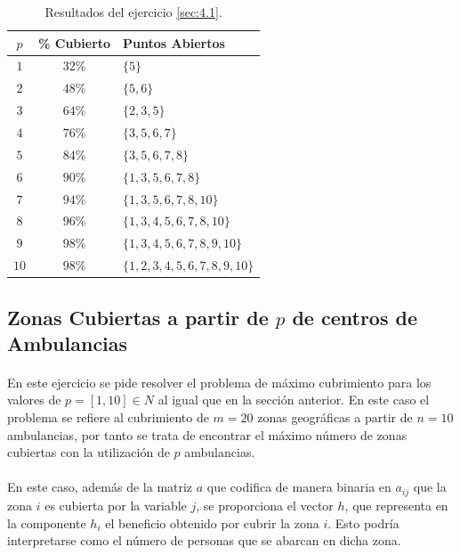 \documentclass[spanish]{article}
\begin{document}
			\begin{table}[h]
				\begin{center}
					\begin{tabular}{|c || c || l |}
						\hline
						$p$		&	\% Cubierto	& Puntos Abiertos \\ \hline \hline
						$1$ 	& $32\%$ & $\{5\}$ \\ \hline
		     		$2$ 	& $48\%$ & $\{5, 6\}$ \\ \hline
						$3$ 	& $64\%$ & $\{2,3,5\}$ \\ \hline
						$4$ 	& $76\%$ & $\{3,5,6,7\}$ \\ \hline
						$5$ 	& $84\%$ & $\{3,5,6,7,8\}$ \\ \hline
						$6$ 	& $90\%$ & $\{1,3,5,6,7,8\}$ \\ \hline
						$7$ 	& $94\%$ & $\{1,3,5,6,7,8,10\}$ \\ \hline
						$8$ 	& $96\%$ & $\{1,3,4,5,6,7,8,10\}$ \\ \hline
						$9$ 	& $98\%$ & $\{1,3,4,5,6,7,8,9,10 \}$ \\ \hline
						$10$	& $98\%$ & $\{1,2,3,4,5,6,7,8,9,10\}$ \\
						\hline
					\end{tabular}
				\end{center}
				\caption{Resultados del ejercicio \ref{sec:4.1}.}
				\label{table:sol-4.1}
			\end{table}


		\subsection{Zonas Cubiertas a partir de $p$ de centros de Ambulancias}
		\label{sec:4.2}

			\paragraph{}
			En este ejercicio se pide resolver el problema de máximo cubrimiento para los valores de $p = [1, 10] \in N$ al igual que en la sección anterior. En este caso el problema se refiere al cubrimiento de $m = 20$ zonas geográficas a partir de $n=10$ ambulancias, por tanto se trata de encontrar el máximo número de zonas cubiertas con la utilización de $p$ ambulancias.

			\paragraph{}
			En este caso, además de la matriz $a$ que codifica de manera binaria en $a_{ij}$ que la zona $i$ es cubierta por la variable $j$, se proporciona el vector $h$, que representa en la componente $h_i$ el beneficio obtenido por cubrir la zona $i$. Esto podría interpretarse como el número de personas que se abarcan en dicha zona.
\end{document}

